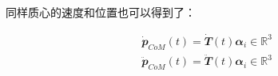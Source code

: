 同样质心的速度和位置也可以得到了：

\begin{align}
    \dot {\mathbfit p}_{CoM}(t) = \dot {\mathbfit T}(t){\mathbfit \alpha}_i \in{\mathbb R}^3 \\
    \ddot {\mathbfit p}_{CoM}(t) = \ddot {\mathbfit T}(t){\mathbfit \alpha}_i \in{\mathbb R}^3
\end{align}



